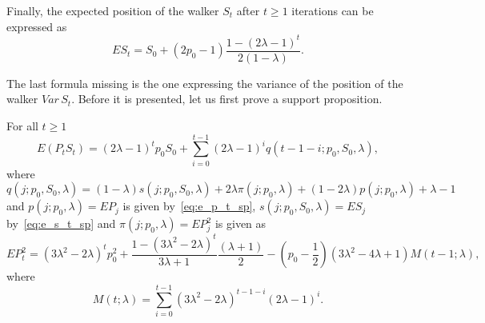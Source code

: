 \documentclass[runningheads]{CMSIM}
\begin{document}
    Finally, the expected position of the walker $S_{t}$ after $t\geq1$
    iterations can be expressed as~\cite{ja2017ddny}
    \begin{equation}
        ES_{t}=S_{0}+(2p_{0}-1)\frac{1-(2\lambda-1)^{t}}{2(1-\lambda)}.\label{eq:e_s_t_sp}
    \end{equation}

    The last formula missing is the one expressing the variance of the
    position of the walker $Var\,S_{t}$.
    Before it is presented, let
    us first prove a support proposition.
    \begin{proposition}
        \label{prop:e_p_s_t_sp}
        For all $t\ge1$
        \begin{equation}
            E(P_{t}S_{t})=(2\lambda-1)^{t}p_{0}S_{0}+\sum_{i=0}^{t-1}(2\lambda-1)^{i}q(t-1-i;p_{0},S_{0},\lambda),\label{eq:e_p_s_t_sp}
        \end{equation}
        where
        \[
            q(j;p_{0},S_{0},\lambda)=(1-\lambda)s(j;p_{0},S_{0},\lambda)+2\lambda\pi(j;p_{0},\lambda)+(1-2\lambda)p(j;p_{0},\lambda)+\lambda-1
        \]
        and $p(j;p_{0},\lambda)=EP_{j}$ is given by~\eqref{eq:e_p_t_sp}, $s(j;p_{0},S_{0},\lambda)=ES_{j}$
        by~\eqref{eq:e_s_t_sp} and $\pi(j;p_{0},\lambda)=EP_{j}^{2}$
        is given as
        \begin{equation}
            EP_{t}^{2}=(3\lambda^{2}-2\lambda)^{t}p_{0}^{2}+\frac{1-(3\lambda^{2}-2\lambda)^{t}}{3\lambda+1}\frac{(\lambda+1)}{2}-(p_{0}-\frac{1}{2})(3\lambda^2 - 4\lambda +1)M(t-1;\lambda),\label{eq:e_p2_t_sp}
        \end{equation}
        where
        \[
            M(t;\lambda)=\sum_{i=0}^{t-1}(3\lambda^{2}-2\lambda)^{t-1-i}(2\lambda-1)^{i}.
        \]
    \end{proposition}
\end{document}
